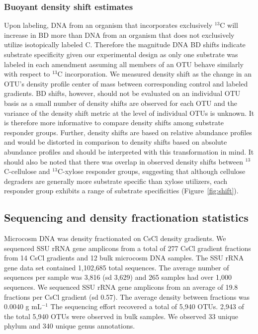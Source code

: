 \documentclass{article}
\begin{document}
\subsubsection{Buoyant density shift estimates}\label{BD}
Upon labeling, DNA from an organism that incorporates exclusively $^{13}$C will
increase in BD more than DNA from an organism that does not exclusively utilize
isotopically labeled C. Therefore the magnitude DNA BD shifts indicate
substrate specificity given our experimental design as only one substrate was
labeled in each amendment assuming all members of an OTU behave similarly with
respect to $^{13}$C incorporation. We measured density shift as the change in
an OTU's density profile center of mass between corresponding control and
labeled gradients. BD shifts, however, should not be evaluated on an individual
OTU basis as a small number of density shifts are observed for each OTU and the
variance of the density shift metric at the level of individual OTUs is
unknown. It is therefore more informative to compare density shifts among
substrate responder groups. Further, density shifts are based on relative
abundance profiles and would be distorted in comparison to density shifts based
on absolute abundance profiles and should be interpreted with this
transformation in mind. It should also be noted that there was overlap in
observed density shifts between $^{13}$C-cellulose and $^{13}$C-xylose
responder groups, suggesting that although cellulose degraders are generally
more substrate specific than xylose utilizers, each responder group exhibits
a range of substrate specificities (Figure~\ref{fig:shift}). 

\subsection{Sequencing and density fractionation statistics}\label{seq_stats}
Microcosm DNA was density fractionated on CsCl density gradients. We sequenced
SSU rRNA gene amplicons from a total of 277 CsCl gradient fractions from 14
CsCl gradients and 12 bulk microcosm DNA samples. The SSU rRNA gene data set
contained 1,102,685 total sequences. The average number of sequences per sample
was 3,816 (sd 3,629) and 265 samples had over 1,000 sequences. We sequenced SSU
rRNA gene amplicons from an average of 19.8 fractions per CsCl gradient (sd
0.57). The average density between fractions was  0.0040 g mL$^{-1}$ The
sequencing effort recovered a total of 5,940 OTUs. 2,943 of the total 5,940
OTUs were observed in bulk samples. We observed 33 unique phylum and 340 unique
genus annotations.
\end{document}
